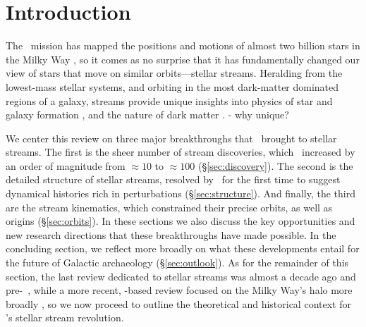 \documentclass[final,5p,times,twocolumn,authoryear]{elsarticle}
\begin{document}
\begin{frontmatter}
\begin{keyword}



\end{keyword}

\end{frontmatter}


\section{Introduction}
\label{sec:intro}

The \gaia\ mission has mapped the positions and motions of almost two billion stars in the Milky Way \citep{gaiamission:2016, gaiadr1, gaiadr2, gaiaedr3, gaiadr3}, so it comes as no surprise that it has fundamentally changed our view of stars that move on similar orbits---stellar streams.
Heralding from the lowest-mass stellar systems, and orbiting in the most dark-matter dominated regions of a galaxy, streams provide unique insights into physics of star and galaxy formation \citep{smith:2016, ferguson:2016, carlin:2016}, and the nature of dark matter \citep{johnston:2016a, johnston:2016b}.
- why unique?


We center this review on three major breakthroughs that \gaia\ brought to stellar streams.
The first is the sheer number of stream discoveries, which \gaia\ increased by an order of magnitude from $\approx10$ to $\approx100$ (\S\ref{sec:discovery}).
The second is the detailed structure of stellar streams, resolved by \gaia\ for the first time to suggest dynamical histories rich in perturbations (\S\ref{sec:structure}).
And finally, the third are the stream kinematics, which constrained their precise orbits, as well as origins (\S\ref{sec:orbits}).
In these sections we also discuss the key opportunities and new research directions that these breakthroughs have made possible.
In the concluding section, we reflect more broadly on what these developments entail for the future of Galactic archaeology (\S\ref{sec:outlook}).
As for the remainder of this section, the last review dedicated to stellar streams was almost a decade ago and pre-\gaia\ \citep{newberg:2016}, while a more recent, \gaia-based review focused on the Milky Way's halo more broadly \citep{helmi:2020}, so we now proceed to outline the theoretical and historical context for \gaia's stellar stream revolution.
\end{document}
